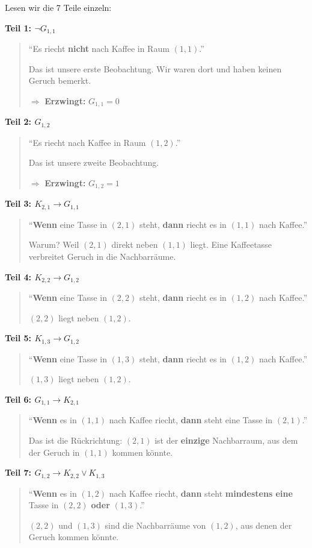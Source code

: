 \documentclass[a4paper,12pt]{article}
\begin{document}
Lesen wir die 7 Teile einzeln:

\bigskip
\textbf{Teil 1: $\neg G_{1,1}$}
\begin{quote}
"`Es riecht \textbf{nicht} nach Kaffee in Raum $(1{,}1)$."'

Das ist unsere erste Beobachtung. Wir waren dort und haben keinen Geruch bemerkt.

$\Rightarrow$ \textbf{Erzwingt:} $G_{1,1} = 0$
\end{quote}

\textbf{Teil 2: $G_{1,2}$}
\begin{quote}
"`Es riecht nach Kaffee in Raum $(1{,}2)$."'

Das ist unsere zweite Beobachtung.

$\Rightarrow$ \textbf{Erzwingt:} $G_{1,2} = 1$
\end{quote}

\textbf{Teil 3: $K_{2,1} \to G_{1,1}$}
\begin{quote}
"`\textbf{Wenn} eine Tasse in $(2{,}1)$ steht, \textbf{dann} riecht es in $(1{,}1)$ nach Kaffee."'

Warum? Weil $(2{,}1)$ direkt neben $(1{,}1)$ liegt. Eine Kaffeetasse verbreitet Geruch in die Nachbarr\"aume.
\end{quote}

\textbf{Teil 4: $K_{2,2} \to G_{1,2}$}
\begin{quote}
"`\textbf{Wenn} eine Tasse in $(2{,}2)$ steht, \textbf{dann} riecht es in $(1{,}2)$ nach Kaffee."'

$(2{,}2)$ liegt neben $(1{,}2)$.
\end{quote}

\textbf{Teil 5: $K_{1,3} \to G_{1,2}$}
\begin{quote}
"`\textbf{Wenn} eine Tasse in $(1{,}3)$ steht, \textbf{dann} riecht es in $(1{,}2)$ nach Kaffee."'

$(1{,}3)$ liegt neben $(1{,}2)$.
\end{quote}

\textbf{Teil 6: $G_{1,1} \to K_{2,1}$}
\begin{quote}
"`\textbf{Wenn} es in $(1{,}1)$ nach Kaffee riecht, \textbf{dann} steht eine Tasse in $(2{,}1)$."'

Das ist die R\"uckrichtung: $(2{,}1)$ ist der \textbf{einzige} Nachbarraum, aus dem der Geruch in $(1{,}1)$ kommen k\"onnte.
\end{quote}

\textbf{Teil 7: $G_{1,2} \to K_{2,2} \vee K_{1,3}$}
\begin{quote}
"`\textbf{Wenn} es in $(1{,}2)$ nach Kaffee riecht, \textbf{dann} steht \textbf{mindestens eine} Tasse in $(2{,}2)$ \textbf{oder} $(1{,}3)$."'

$(2{,}2)$ und $(1{,}3)$ sind die Nachbarr\"aume von $(1{,}2)$, aus denen der Geruch kommen k\"onnte.
\end{quote}
\end{document}
